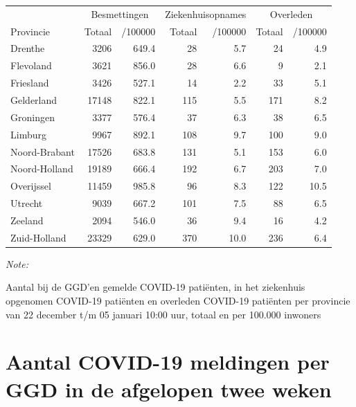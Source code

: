 \documentclass[
  english,
  man,floatsintext]{apa6}
\begin{document}
\begin{table}[H]
\centering
\begin{threeparttable}
\begin{tabular}{lrrrrrr}
\toprule
\multicolumn{1}{c}{ } & \multicolumn{2}{c}{Besmettingen} & \multicolumn{2}{c}{Ziekenhuisopnames} & \multicolumn{2}{c}{Overleden} \\
\cmidrule(l{3pt}r{3pt}){2-3} \cmidrule(l{3pt}r{3pt}){4-5} \cmidrule(l{3pt}r{3pt}){6-7}
Provincie & Totaal & /100000 & Totaal & /100000 & Totaal & /100000\\
\midrule
Drenthe & 3206 & 649.4 & 28 & 5.7 & 24 & 4.9\\
Flevoland & 3621 & 856.0 & 28 & 6.6 & 9 & 2.1\\
Friesland & 3426 & 527.1 & 14 & 2.2 & 33 & 5.1\\
Gelderland & 17148 & 822.1 & 115 & 5.5 & 171 & 8.2\\
Groningen & 3377 & 576.4 & 37 & 6.3 & 38 & 6.5\\
Limburg & 9967 & 892.1 & 108 & 9.7 & 100 & 9.0\\
Noord-Brabant & 17526 & 683.8 & 131 & 5.1 & 153 & 6.0\\
Noord-Holland & 19189 & 666.4 & 192 & 6.7 & 203 & 7.0\\
Overijssel & 11459 & 985.8 & 96 & 8.3 & 122 & 10.5\\
Utrecht & 9039 & 667.2 & 101 & 7.5 & 88 & 6.5\\
Zeeland & 2094 & 546.0 & 36 & 9.4 & 16 & 4.2\\
Zuid-Holland & 23329 & 629.0 & 370 & 10.0 & 236 & 6.4\\
\bottomrule
\end{tabular}
\begin{tablenotes}
\item \textit{Note: } 
\item Aantal bij de GGD’en gemelde COVID-19 patiënten, in het ziekenhuis opgenomen COVID-19 patiënten en overleden COVID-19 patiënten per provincie van 22 december t/m 05 januari 10:00 uur, totaal en per 100.000 inwoners
\end{tablenotes}
\end{threeparttable}
\end{table}

\newpage

\hypertarget{aantal-covid-19-meldingen-per-ggd-in-de-afgelopen-twee-weken}{%
\section{Aantal COVID-19 meldingen per GGD in de afgelopen twee weken}\label{aantal-covid-19-meldingen-per-ggd-in-de-afgelopen-twee-weken}}
\end{document}
